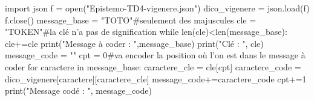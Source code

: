 \begin{python}
import json
f = open("Epistemo-TD4-vigenere.json")
dico_vigenere = json.load(f)
f.close()
message_base = "TOTO"#seulement des majuscules
cle = "TOKEN"#la clé n'a pas de signification
while len(cle)<len(message_base):
  cle+=cle
print("Message à coder : ",message_base)
print("Clé : ", cle)
message_code = ""
cpt = 0#va encoder la position où l'on est dans le message à coder
for caractere in message_base:
  caractere_cle = cle[cpt]
  caractere_code = dico_vigenere[caractere][caractere_cle]
  message_code+=caractere_code
  cpt+=1
print("Message codé : ", message_code)

\end{python}
